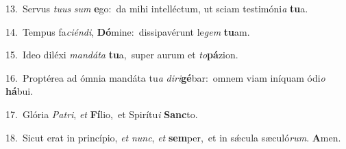 {\numbfont\textcolor{\numbcolor}{13.}}~Servus \textit{tu}\-\textit{us} \textit{sum} \textbf{e}\-go:~\star da mihi intelléctum, ut sciam testimóni\textit{a} \textbf{tu}\-a.\par
{\numbfont\textcolor{\numbcolor}{14.}}~Tempus fa\-\textit{ci}\-\textit{én}\textit{di}, \textbf{Dó}\-mine:~\star dissipavérunt le\textit{gem} \textbf{tu}\-am.\par
{\numbfont\textcolor{\numbcolor}{15.}}~Ideo diléxi \textit{man}\-\textit{dá}\textit{ta} \textbf{tu}\-a,~\star super aurum et \textit{to}\-\textbf{pá}zion.\par
{\numbfont\textcolor{\numbcolor}{16.}}~Proptérea ad ómnia mandáta tu\textit{a} \textit{di}\-\textit{ri}\textbf{gé}bar:~\star omnem viam iníquam ódi\textit{o} \textbf{há}\-bui.\par
{\numbfont\textcolor{\numbcolor}{17.}}~Glória \textit{Pa}\-\textit{tri}, \textit{et} \textbf{Fí}\-lio,~\star et Spirítu\textit{i} \textbf{Sanc}\-to.\par
{\numbfont\textcolor{\numbcolor}{18.}}~Sicut erat in princípio, \textit{et} \textit{nunc}\-, \textit{et} \textbf{sem}\-per,~\star et in sǽcula sæculó\-\textit{rum}\-. \textbf{A}\-men.\par
